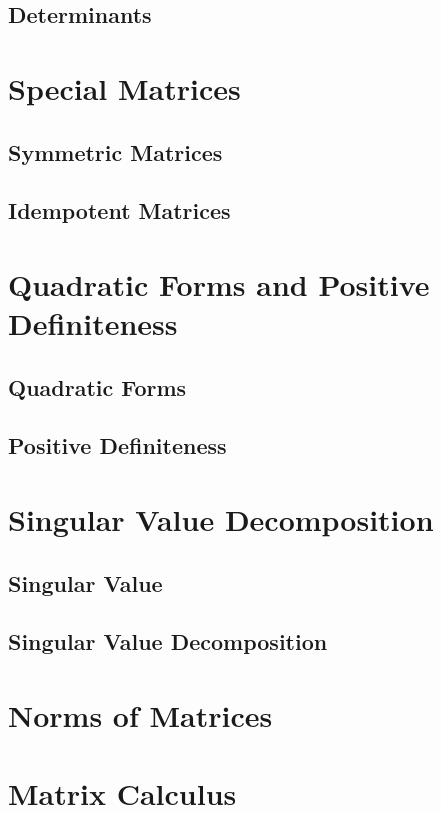 \documentclass{article}
\begin{document}
\subsection{Determinants}

\section{Special Matrices}

\subsection{Symmetric Matrices}

\subsection{Idempotent Matrices}

\section{Quadratic Forms and Positive Definiteness}

\subsection{Quadratic Forms}

\subsection{Positive Definiteness}

\section{Singular Value Decomposition}

\subsection{Singular Value}

\subsection{Singular Value Decomposition}

\section{Norms of Matrices}

\section{Matrix Calculus}
\end{document}
